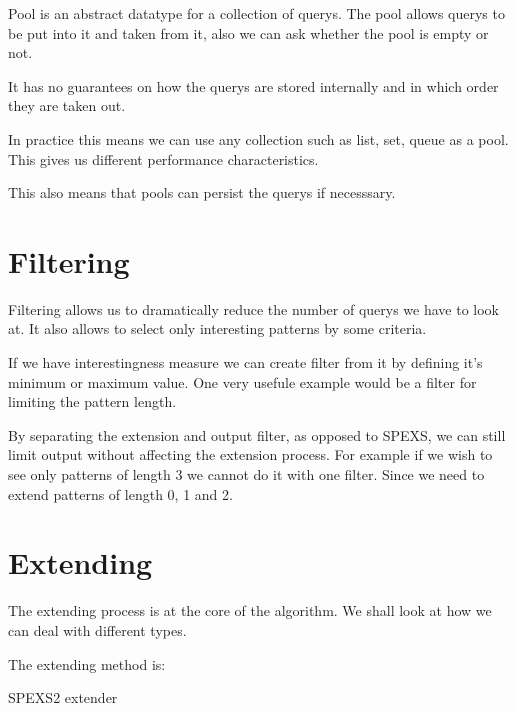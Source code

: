 Pool is an abstract datatype for a collection of querys. The pool
allows querys to be put into it and taken from it, also we can
ask whether the pool is empty or not.

It has no guarantees on how the querys are stored internally and
in which order they are taken out.

In practice this means we can use any collection such as list, set,
queue as a pool. This gives us different performance characteristics.

This also means that pools can persist the querys if necesssary.

\section{Filtering}

Filtering allows us to dramatically reduce the number of querys
we have to look at. It also allows to select only interesting patterns by
some criteria.

If we have interestingness measure we can create filter from it by
defining it's minimum or maximum value. One very usefule example 
would be a filter for limiting the pattern length.

By separating the extension and output filter, as opposed to SPEXS, 
we can still limit output without affecting the extension process.
For example if we wish to see only patterns of length 3 we cannot do
it with one filter. Since we need to extend patterns of length 0, 1 and 2.

\section{Extending}

The extending process is at the core of the algorithm. 
We shall look at how we can deal with different types.

The extending method is:

\begin{algorithm}[H]
	\caption{SPEXS2 extender}
\begin{algorithmic}[1]
	
	\EndFor

		\EndIf
	\EndFor

	\EndFor
\end{algorithmic}
\end{algorithm}

